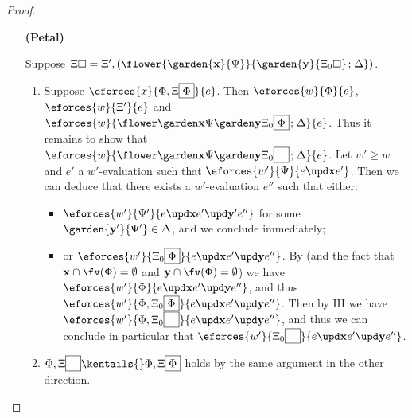 \begin{proof}
\begin{itemize}
\begin{itemize}
        \item[\textbf{(Petal)}]
          \renewcommand{\FillXi}[1]{\Xi', (\flower{\garden{\bx}{\Psi}}{\garden{\by}{#1}
          \sep \Delta})}
          \renewcommand{\rFillXi}[1]{\flower{\garden{\bx}{\Psi}}{\garden{\by}{#1}
          \sep \Delta}}

          Suppose $\Xi\hole = \FillXi{\Xi_0\hole}$.
          \begin{enumerate}
            \item Suppose $\eforces{x}{\Phi, \ffillXi{\Phi}}{e}$. Then
            $\eforces{w}{\Phi}{e}$, $\eforces{w}{\Xi'}{e}$ and
            $\eforces{w}{\rfillXi{\Phi}}{e}$. Thus it remains to show that
            $\eforces{w}{\rfillXi{\phantom{\Phi}}}{e}$. Let $w' \geq w$ and $e'$
            a $w'$-evaluation such that
            $\eforces{w'}{\Psi}{\update{e}{\bx}{e'}}$. Then we can deduce
            that there exists a $w'$-evaluation $e''$ such that either:
            \begin{itemize}
              \item
              $\eforces{w'}{\Psi'}{\update{e}{\bx}{\update{e'}{\mathbf{y'}}{e''}}}$
              for some $\garden{\mathbf{y'}}{\Psi'} \in \Delta$, and we conclude
              immediately;
              \item
              or
              $\eforces{w'}{\Xi_0\select{\Phi}}{\update{e}{\bx}{\update{e'}{\by}{e''}}}$.
              By  (and the fact that $\bx \cap
              \fv(\Phi) = \emptyset$ and $\by \cap \fv(\Phi) =
              \emptyset$) we have
              $\eforces{w'}{\Phi}{\update{e}{\bx}{\update{e'}{\by}{e''}}}$,
              and thus $\eforces{w'}{\Phi,
              \Xi_0\select{\Phi}}{\update{e}{\bx}{\update{e'}{\by}{e''}}}$.
              Then by IH we have $\eforces{w'}{\Phi,
              \Xi_0\select{\phantom{\Phi}}}{\update{e}{\bx}{\update{e'}{\by}{e''}}}$,
              and thus we can conclude in particular that $\eforces{w'}{
              \Xi_0\select{\phantom{\Phi}}}{\update{e}{\bx}{\update{e'}{\by}{e''}}}$.
            \end{itemize}

            \item $\Phi, \ffillXi{\phantom{\Phi}} \kentails{}\Phi,
            \ffillXi{\Phi}$ holds by the same argument in the other direction.
          \end{enumerate}
      \end{itemize}
  \end{itemize}
\end{proof}

